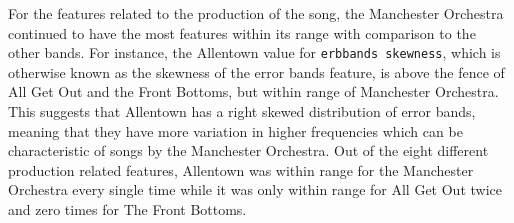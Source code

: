 \documentclass{article}\usepackage[]{graphicx}\usepackage[]{xcolor}
\begin{document}
\begin{multicols}{2}
    For the features related to the production of the song, the Manchester Orchestra continued to have the most features within its range with comparison to the other bands. For instance, the Allentown value for \texttt{erbbands skewness}, which is otherwise known as the skewness of the error bands feature, is above the fence of All Get Out and the Front Bottoms, but within range of Manchester Orchestra. This suggests that Allentown has a right skewed distribution of error bands, meaning that they have more variation in higher frequencies which can be characteristic of songs by the Manchester Orchestra. Out of the eight different production related features, Allentown was within range for the Manchester Orchestra every single time while it was only within range for All Get Out twice and zero times for The Front Bottoms.


\end{multicols}
\end{document}
